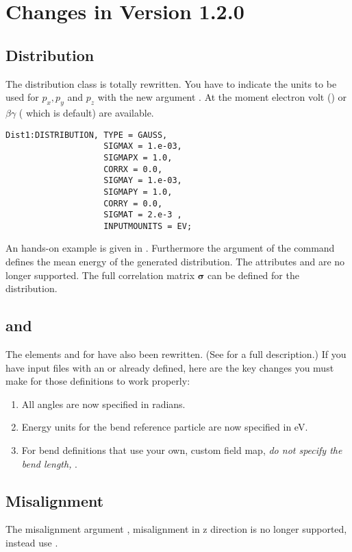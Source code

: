 \section{Changes in \opal Version 1.2.0}
\subsection{Distribution}
The distribution class is totally rewritten. You have to indicate the units to be used for $p_x,p_y$ and $p_z$ with the
new argument . At the moment electron volt () or $\beta\gamma$ ( which is default) are available.
\begin{Verbatim}[label={My orange command sample output}]
Dist1:DISTRIBUTION, TYPE = GAUSS,
                    SIGMAX = 1.e-03,
                    SIGMAPX = 1.0,
                    CORRX = 0.0,
                    SIGMAY = 1.e-03,
                    SIGMAPY = 1.0,
                    CORRY = 0.0,
                    SIGMAT = 2.e-3 ,
                    INPUTMOUNITS = EV;
\end{Verbatim}
An hands-on example is given in . Furthermore the  argument of the  command defines the mean energy of the generated distribution. The attributes  and  are no longer supported. The full
correlation matrix $\mathbf\sigma$ can be defined for the  distribution.

\subsection{ and }
The elements  and  for \opalt have also been rewritten. (See  for a
full description.) If you have input files with an  or  already defined, here are the key
changes you must make for those definitions to work properly:

\begin{enumerate}
\item All angles are now specified in radians.
\item Energy units for the bend reference particle are now specified in eV.
\item For bend definitions that use your own, custom field map, \emph{do not specify the bend length, }.
\end{enumerate}

\subsection{Misalignment}
The misalignment argument , misalignment in z direction is no longer supported, instead use .

